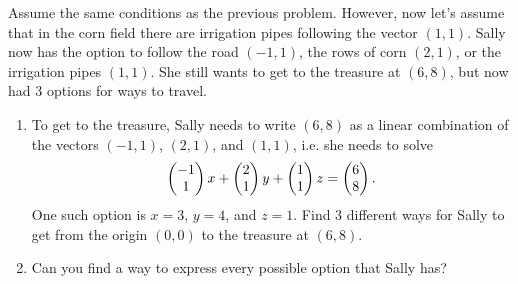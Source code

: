 \begin{problem}\label{salley in corn field with 3 directions}
 Assume the same conditions as the previous problem. However, now let's assume that in the corn field there are irrigation pipes following the vector $(1,1)$.  Sally now has the option to follow the road $(-1,1)$, the rows of corn $(2,1)$, or the irrigation pipes $(1,1)$. She still wants to get to the treasure at $(6,8)$, but now had 3 options for ways to travel. 
\begin{enumerate}
 \item To get to the treasure, Sally needs to write $(6,8)$ as a linear combination of the vectors $(-1,1)$, $(2,1)$, and $(1,1)$, i.e. she needs to solve
$$\begin{pmatrix} -1\\1 \end{pmatrix}x+\begin{pmatrix} 2\\1 \end{pmatrix}y+\begin{pmatrix} 1\\1 \end{pmatrix}z=\begin{pmatrix} 6\\8 \end{pmatrix}.$$ 
One such option is $x=3$, $y=4$, and $z=1$.   
Find 3 different ways for Sally to get from the origin $(0,0)$ to the treasure at $(6,8)$. 
 \item Can you find a way to express every possible option that Sally has?
\end{enumerate}
\end{problem}


\mysubsection{\ideagau}

